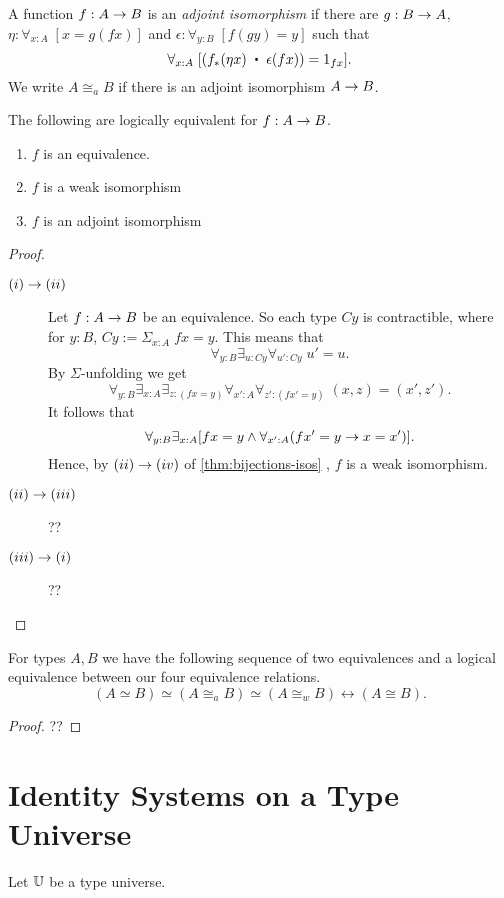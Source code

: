\begin{defn} A function $f:A\rightarrow B$ is an {\em adjoint isomorphism} if there are $g:B\rightarrow A$, $\eta:\forall_{x:A}\; [x=g(fx)]$ and $\epsilon:\forall_{y:B}\; [f(gy)=y]$ such that 
  \[\forall_{x:A}\;[(\map{f}{\eta x}\; \ct\;\epsilon(fx))=1_{fx}].\]
We write $A\cong_a B$ if there is an adjoint isomorphism $A\rightarrow B$.
\end{defn}
\begin{thm}\label{thm:equiv-iso-adj} The following are logically equivalent for $f:A\rightarrow B$.
\begin{enumerate}
\item $f$ is an equivalence.
\item $f$ is a weak isomorphism
\item $f$ is an adjoint isomorphism
\end{enumerate}
\end{thm}
\begin{proof} $\;$

\begin{description}
\item[$(i)\rightarrow (ii)$] 
Let $f:A\rightarrow B$ be an equivalence.  So each type $Cy$ is contractible, where for $y:B$, $Cy := \Sigma_{x:A}\; fx=y$.  This means that
  \[ \forall_{y:B}\exists_{u:Cy}\forall_{u':Cy}\; u'=u.\]
By $\Sigma$-unfolding we get
  \[ \forall_{y:B}\exists_{x:A}\exists_{z:(fx=y)}
                            \forall_{x':A}\forall_{z':(fx'=y)}\; (x,z)=(x',z').
  \]
It follows that
  \[ \forall_{y:B}\exists_{x:A}[fx=y\wedge\forall_{x':A}(fx'=y\rightarrow  x=x')].
  \]
Hence, by $(ii)\rightarrow (iv)$ of \autoref{thm:bijections-isos} , $f$ is a weak isomorphism.
\item[$(ii)\rightarrow (iii)$] ??
\item[$(iii)\rightarrow (i)$] ??
\end{description}
\end{proof}
\begin{cor}\label{cor:equivs-equiv}
For types $A,B$ we have the following sequence of two equivalences and a logical equivalence
between our four equivalence relations.
  \[ (A\simeq B) \simeq (A\cong_a B) \simeq (A\cong_w B) \leftrightarrow (A\cong B).\]
\end{cor}
\begin{proof} ??

\end{proof}

\section{Identity Systems on a Type Universe}
\newcommand{\sfr}[1]{{{\sf r}_{#1}}}
Let $\mathbb{U}$ be a type universe.

